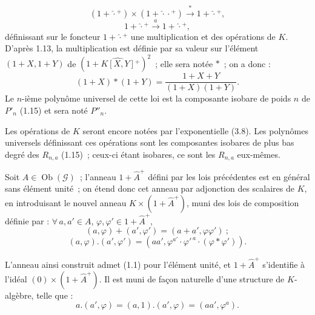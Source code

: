 \[
  (1+\widehat{\cdot}{}^{+})\times(1+\widehat{\cdot}\cdot{}^{+})\xrightarrow{\ \ast\ }1+\widehat{\cdot}{}^{+},
\]
\[
  1+\widehat{\cdot}{}^{+}\xrightarrow{\ a\ }1+\widehat{\cdot}{}^{+},
\]
définissant sur le foncteur \(1+\widehat{\cdot}{}^{+}\) une multiplication et des opérations de \(K\). D'après 1.13, la multiplication est définie par sa valeur sur l'élément \((1+X,1+Y)\) de \((1+\widehat{K[X,Y]}{}^{+})^{2}\)~; elle sera notée \(\ast\)~; on a donc :
\begin{equation}\tag{6.1.1}
  (1+X)\ast(1+Y)=\frac{1+X+Y}{(1+X)(1+Y)}.
\end{equation}
Le \(n\)-ième polynôme universel de cette loi est la composante isobare de poids \(n\) de \(P'_n\) (1.15) et sera noté \(P''_n\).

Les opérations de \(K\) seront encore notées par l'exponentielle (3.8). Les polynômes universels définissant ces opérations sont les composantes isobares de plus bas degré des \(R_{n,a}\) (1.15)~; ceux-ci étant isobares, ce sont les \(R_{n,a}\) eux-mêmes.

Soit \(A\in\operatorname{Ob}(\mathcal G)\)~; l'anneau \(1+\widehat A^{+}\) défini par les lois précédentes est en général sans élément unité~; on étend donc cet anneau par adjonction des scalaires de \(K\), en introduisant le nouvel anneau \(K\times(1+\widehat A^{+})\), muni des lois de composition définie par : \(\forall\,a,a'\in A\), \(\varphi,\varphi'\in1+\widehat A^{+}\),
\[
  (a,\varphi)+(a',\varphi')=(a+a',\varphi\varphi')~;
\]
\begin{equation}\tag{6.1.2}
  (a,\varphi).(a',\varphi')=(aa',\varphi^{a'}\cdot{\varphi'}^{\,a}\cdot(\varphi\ast\varphi')).
\end{equation}

L'anneau ainsi construit admet (1.1) pour l'élément unité, et \(1+\widehat A^{+}\) s'identifie à l'idéal \((0)\times(1+\widehat A^{+})\). Il est muni de façon naturelle d'une structure de \(K\)-algèbre, telle que :
\begin{equation}\tag{6.1.3}
  a.(a',\varphi)=(a,1).(a',\varphi)=(aa',\varphi^{a}).
\end{equation}

